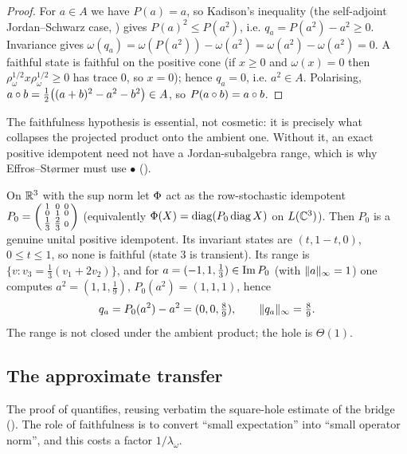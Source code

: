 \begin{proof}
For $a\in A$ we have $P(a)=a$, so Kadison's inequality (the self-adjoint
Jordan--Schwarz case, ) gives $P(a)^2\le P(a^2)$, i.e.
$q_a=P(a^2)-a^2\ge0$. Invariance gives
$\omega(q_a)=\omega(P(a^2))-\omega(a^2)=\omega(a^2)-\omega(a^2)=0$. A faithful
state is faithful on the positive cone (if $x\ge0$ and $\omega(x)=0$ then
$\rho_\omega^{1/2}x\rho_\omega^{1/2}\ge0$ has trace $0$, so $x=0$); hence
$q_a=0$, i.e. $a^2\in A$. Polarising,
$a\circ b=\tfrac12\big((a+b)^2-a^2-b^2\big)\in A$, so $P(a\circ b)=a\circ b$.
\end{proof}

The faithfulness hypothesis is essential, not cosmetic: it is precisely what
collapses the projected product onto the ambient one. Without it, an exact
positive idempotent need not have a Jordan-subalgebra range, which is why
Effros--St{\o}rmer must use $\bullet$ ().

\begin{example}\label{ex:no-faithful}
On $\mathbb{R}^3$ with the sup norm let $\Phi$ act as the row-stochastic idempotent
$P_0=\begin{psmallmatrix}1&0&0\\0&1&0\\ \tfrac13&\tfrac23&0\end{psmallmatrix}$
(equivalently $\Phi(X)=\mathrm{diag}(P_0\,\mathrm{diag}\,X)$ on $L(\mathbb{C}^3)$).
Then $P_0$ is a genuine unital positive idempotent. Its invariant states are
$(t,1-t,0)$, $0\le t\le1$, so none is faithful (state $3$ is transient). Its range is
$\{v:v_3=\tfrac13(v_1+2v_2)\}$, and for $a=(-1,1,\tfrac13)\in\operatorname{Im} P_0$
(with $\lVert a \rVert_\infty=1$) one computes $a^2=(1,1,\tfrac19)$, $P_0(a^2)=(1,1,1)$,
hence
\[
  q_a=P_0(a^2)-a^2=(0,0,\tfrac89),\qquad \lVert q_a \rVert_\infty=\tfrac89 .
\]
The range is not closed under the ambient product; the hole is $\Theta(1)$.
\end{example}

\subsection*{The approximate transfer}

The proof of  quantifies, reusing verbatim the
square-hole estimate of the bridge (). The role of
faithfulness is to convert ``small expectation'' into ``small operator norm'',
and this costs a factor $1/\lambda_\omega$.

